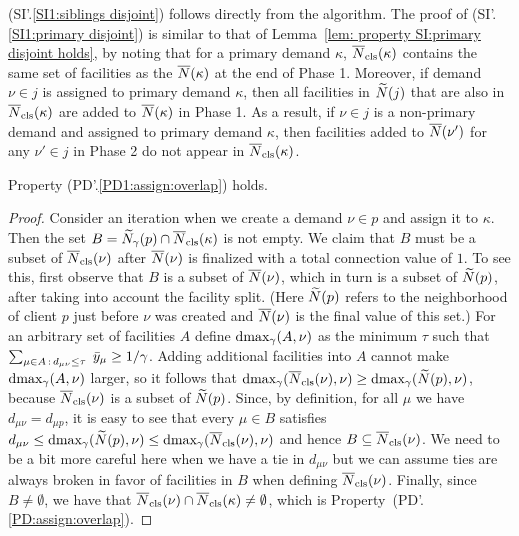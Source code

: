 (SI'.\ref{SI1:siblings disjoint}) follows directly from the
algorithm. The proof of (SI'.\ref{SI1:primary disjoint}) is similar to
that of Lemma~\ref{lem: property SI:primary disjoint holds}, by noting
that for a primary demand $\kappa$, ${\overline{N}}_{\text{cls}}(\kappa)$ contains the
same set of facilities as the ${\overline{N}}(\kappa)$ at the end of Phase
1. Moreover, if demand $\nu\in j$ is assigned to primary demand
$\kappa$, then all facilities in ${\widetilde N}(j)$ that are also in
${\overline{N}}_{\text{cls}}(\kappa)$ are added to ${\overline{N}}(\kappa)$ in Phase 1. As a
result, if $\nu \in j$ is a non-primary demand and assigned to primary
demand $\kappa$, then facilities added to ${\overline{N}}(\nu')$ for any
$\nu'\in j$ in Phase 2 do not appear in ${\overline{N}}_{\text{cls}}(\kappa)$.



\begin{lemma} \label{lem: PD1: primary overlap}
  Property (PD'.\ref{PD1:assign:overlap}) holds.
\end{lemma}
\begin{proof}
Consider an iteration when we create a demand $\nu\in p$ and assign it
to $\kappa$. Then the set $B={\widetilde N}_{\gamma}(p)\cap
{\overline{N}}_{\text{cls}}(\kappa)$ is not empty.  We claim that $B$ must be a subset
of ${\overline{N}}_{\text{cls}}(\nu)$ after ${\overline{N}}(\nu)$ is finalized with a total
connection value of $1$. To see this, first observe that $B$ is a
subset of ${\overline{N}}(\nu)$, which in turn is a subset of ${\widetilde N}(p)$,
after taking into account the facility split. (Here ${\widetilde N}(p)$
refers to the neighborhood of client $p$ just before $\nu$ was created
and ${\overline{N}}(\nu)$ is the final value of this set.)  For an arbitrary
set of facilities $A$ define $\text{dmax}_\gamma(A, \nu)$ as the minimum
$\tau$ such that $\sum_{\mu\in A {\,:\,} d_{\mu\nu} \leq
  \tau}\;{\bar y}_{\mu} \geq 1/\gamma$.  Adding additional facilities
into $A$ cannot make $\text{dmax}_\gamma(A, \nu)$ larger, so it follows that
$\text{dmax}_\gamma ({\overline{N}}_{\text{cls}}(\nu), \nu) \geq \text{dmax}_\gamma({\widetilde N}(p),
\nu)$, because ${\overline{N}}_{\text{cls}}(\nu)$ is a subset of ${\widetilde N}(p)$. Since,
by definition, for all $\mu$ we have $d_{\mu \nu} = d_{\mu p}$, it is
easy to see that every $\mu \in B$ satisfies $d_{\mu \nu} \leq
\text{dmax}_\gamma({\widetilde N}(p), \nu) \leq \text{dmax}_\gamma({\overline{N}}_{\text{cls}}(\nu),
\nu)$ and hence $B\subseteq {\overline{N}}_{\text{cls}}(\nu)$. We need to be a bit more
careful here when we have a tie in $d_{\mu\nu}$ but we can assume ties
are always broken in favor of facilities in $B$ when defining
${\overline{N}}_{\text{cls}}(\nu)$. Finally, since $B\neq\emptyset$, we have that
${\overline{N}}_{\text{cls}}(\nu)\cap {\overline{N}}_{\text{cls}}(\kappa)\neq\emptyset$, which is
Property~(PD'.\ref{PD:assign:overlap}).
\end{proof}


